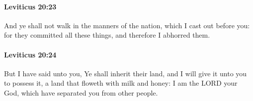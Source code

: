 		\paragraph{Leviticus 20:23} %
			\label{LEVITICUS-20-23}

			And ye shall not walk in the manners of the nation, which I cast out before you: for they committed all these things, and therefore I abhorred them.


		\paragraph{Leviticus 20:24} %
			\label{LEVITICUS-20-24}

			But I have said unto you, Ye shall inherit their land, and I will give it unto you to possess it, a land that floweth with milk and honey: I am the LORD your God, which have separated you from other people.

